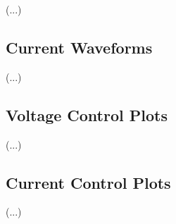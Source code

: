 (...)\\

\lipsum[8]

\subsection{Current Waveforms}

(...)\\

\lipsum[9]

\subsection{Voltage Control Plots}

(...)\\

\lipsum[10]

\subsection{Current Control Plots}

(...)\\